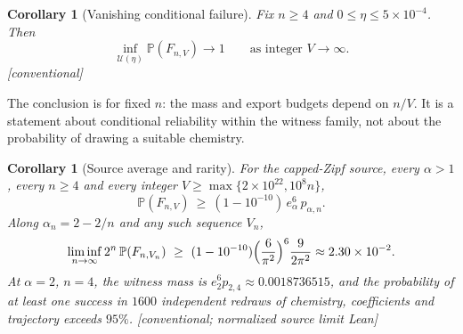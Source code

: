 \documentclass[11pt,letterpaper]{article}
\theoremstyle{plain}
\newtheorem{corollary}[theorem]{Corollary}
\theoremstyle{definition}
\theoremstyle{remark}
\numberwithin{equation}{section}
\newcommand{\PP}{\mathbb P}
\newcommand{\cU}{\mathcal U}
\newcommand{\evid}[1]{{\normalfont\small\textsf{[}#1\textsf{]}}}
\begin{document}
\begin{corollary}[Vanishing conditional failure]\label{cor:limit}
Fix $n\ge4$ and $0\le\eta\le5\times10^{-4}$. Then
\[
 \inf_{\cU(\eta)}\PP(F_{n,V})\longrightarrow1\qquad\text{as integer }V\to\infty .
\]
\evid{conventional}
\end{corollary}
The conclusion is for fixed $n$: the mass and export budgets depend on $n/V$. It is a statement about conditional reliability within the witness family, not about the probability of drawing a suitable chemistry.

\begin{corollary}[Source average and rarity]\label{cor:source}
For the capped-Zipf source, every $\alpha>1$, every $n\ge4$ and every integer $V\ge\max\{2\times10^{22},10^8n\}$,
\begin{equation}\label{eq:sourcelower}
 \PP(F_{n,V})\ \ge\ (1-10^{-10})\,e_\alpha^6\,p_{\alpha,n}.
\end{equation}
Along $\alpha_n=2-2/n$ and any such sequence $V_n$,
\begin{equation}\label{eq:rarity}
 \liminf_{n\to\infty}2^n\,\PP(F_{n,V_n})\ \ge\ (1-10^{-10})\Bigl(\frac6{\pi^2}\Bigr)^{6}\frac9{2\pi^2}\approx2.30\times10^{-2}.
\end{equation}
At $\alpha=2$, $n=4$, the witness mass is $e_2^6p_{2,4}\approx0.0018736515$, and the probability of at least one success in $1600$ independent redraws of chemistry, coefficients and trajectory exceeds $95\%$. \evid{conventional; normalized source limit Lean}
\end{corollary}
\end{document}
